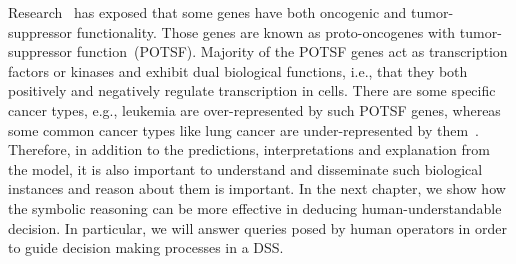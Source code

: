 \hspace*{3.5mm} Research~\cite{POSTF} has exposed that some genes have both oncogenic and tumor-suppressor functionality. Those genes are known as proto-oncogenes with tumor-suppressor function~(POTSF). Majority of the POTSF genes act as transcription factors or kinases and exhibit dual biological functions, i.e., that they both positively and negatively regulate transcription in cells. There are some specific cancer types, e.g., leukemia are over-represented by such POTSF genes, whereas some common cancer types like lung cancer are under-represented by them~\cite{POSTF}. Therefore, in addition to the predictions, interpretations and explanation from the model, it is also important to understand and disseminate such biological instances and reason about them is important. In the next chapter, we show how the symbolic reasoning can be more effective in deducing human-understandable decision. In particular, we will answer queries posed by human operators in order to guide decision making processes in a DSS. 

